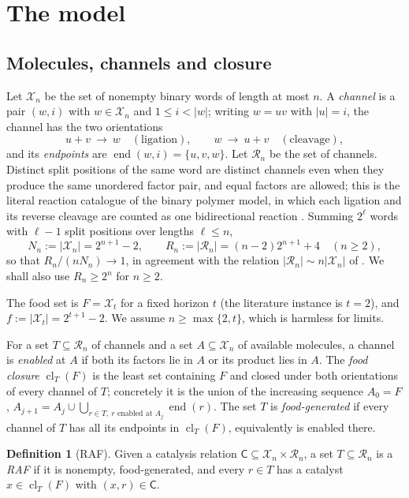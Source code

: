 \documentclass[11pt,a4paper]{article}
\theoremstyle{plain}
\theoremstyle{definition}
\newtheorem{definition}[theorem]{Definition}
\theoremstyle{remark}
\newcommand{\cl}{\operatorname{cl}}
\newcommand{\cR}{\mathcal R}
\newcommand{\cX}{\mathcal X}
\newcommand{\eend}{\operatorname{end}}
\begin{document}
\section{The model}\label{sec:model}

\subsection{Molecules, channels and closure}

Let $\cX_n$ be the set of nonempty binary words of length at most $n$. A \emph{channel} is a pair $(w,i)$ with $w\in\cX_n$ and $1\le i<|w|$; writing $w=uv$ with $|u|=i$, the channel has the two orientations
\[
u+v\ \longrightarrow\ w\quad(\text{ligation}),\qquad w\ \longrightarrow\ u+v\quad(\text{cleavage}),
\]
and its \emph{endpoints} are $\eend(w,i)=\{u,v,w\}$. Let $\cR_n$ be the set of channels. Distinct split positions of the same word are distinct channels even when they produce the same unordered factor pair, and equal factors are allowed; this is the literal reaction catalogue of the binary polymer model, in which each ligation and its reverse cleavage are counted as one bidirectional reaction \cite{hordijk2016variable}. Summing $2^\ell$ words with $\ell-1$ split positions over lengths $\ell\le n$,
\begin{equation}\label{eq:counts}
N_n:=|\cX_n|=2^{n+1}-2,\qquad R_n:=|\cR_n|=(n-2)2^{n+1}+4\quad(n\ge2),
\end{equation}
so that $R_n/(nN_n)\to1$, in agreement with the relation $|\cR_n|\sim n|\cX_n|$ of \cite{mossel2005random}. We shall also use $R_n\ge 2^n$ for $n\ge 2$.

The food set is $F=\cX_t$ for a fixed horizon $t$ (the literature instance is $t=2$), and $f:=|\cX_t|=2^{t+1}-2$. We assume $n\ge\max\{2,t\}$, which is harmless for limits.

For a set $T\subseteq\cR_n$ of channels and a set $A\subseteq\cX_n$ of available molecules, a channel is \emph{enabled} at $A$ if both its factors lie in $A$ or its product lies in $A$. The \emph{food closure} $\cl_T(F)$ is the least set containing $F$ and closed under both orientations of every channel of $T$; concretely it is the union of the increasing sequence $A_0=F$, $A_{j+1}=A_j\cup\bigcup_{r\in T,\ r\text{ enabled at }A_j}\eend(r)$. The set $T$ is \emph{food-generated} if every channel of $T$ has all its endpoints in $\cl_T(F)$, equivalently is enabled there.

\begin{definition}[RAF]\label{def:raf}
Given a catalysis relation $\mathsf{C}\subseteq\cX_n\times\cR_n$, a set $T\subseteq\cR_n$ is a \emph{RAF} if it is nonempty, food-generated, and every $r\in T$ has a catalyst $x\in\cl_T(F)$ with $(x,r)\in\mathsf{C}$.
\end{definition}
\end{document}
